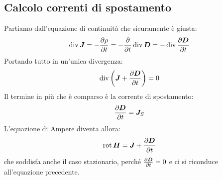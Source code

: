 \subsection{Calcolo correnti di spostamento}
Partiamo dall'equazione di continuità che sicuramente è giusta:
\begin{equation}
\operatorname{div}\boldsymbol{J}=-\frac{\partial\rho}{\partial t}=-\frac{\partial}{\partial t}\operatorname{div}\boldsymbol{D}=-\operatorname{div}\frac{\partial\boldsymbol{D}}{\partial t}
\end{equation}
Portando tutto in un'unica divergenza:
\begin{equation}
\operatorname{div}\left(\boldsymbol{J}+\frac{\partial\boldsymbol{D}}{\partial t}\right)=0
\end{equation}
Il termine in più che è comparso è la corrente di spostamento:
\begin{equation}
\frac{\partial\boldsymbol{D}}{\partial t}=\boldsymbol{J}_S
\end{equation}
L'equazione di Ampere diventa allora:
\begin{equation}
\operatorname{rot}\boldsymbol{H}=\boldsymbol{J}+\frac{\partial\boldsymbol{D}}{\partial t}
\end{equation}
che soddisfa anche il caso stazionario, perché $\frac{\partial\boldsymbol{D}}{\partial t}=0$ e ci si riconduce all'equazione precedente.
